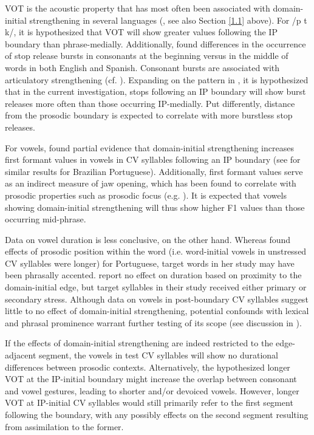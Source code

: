 \documentclass[output=paper]{langscibook}
\begin{document}
VOT is the acoustic property that has most often been associated with domain-initial strengthening in several languages (\citealt{c16}, see also Section \ref{1.1} above). For /p t k/, it is hypothesized that VOT will show greater values following the IP boundary than phrase-medially. Additionally, \citet{l01} found differences in the occurrence of stop release bursts in consonants at the beginning versus in the middle of words in both English and Spanish. Consonant bursts are associated with articulatory strengthening (cf. \citealt{sk89, te11}). Expanding on the pattern in \citet{l01}, it is hypothesized that in the current investigation, stops following an IP boundary will show burst releases more often than those occurring IP-medially. Put differently, distance from the prosodic boundary is expected to correlate with more burstless stop releases.

For vowels, \citet{ck09} found partial evidence that domain-initial strengthening increases first formant values in vowels in CV syllables following an IP boundary (see \citealt{o19} for similar results for Brazilian Portuguese). Additionally, first formant values serve as an indirect measure of jaw opening, which has been found to correlate with prosodic properties such as prosodic focus (e.g. \citealt{e98}). It is expected that vowels showing domain-initial strengthening will thus show higher F1 values than those occurring mid-phrase. 

Data on vowel duration is less conclusive, on the other hand. Whereas \citet{o19} found effects of prosodic position within the word (i.e. word-initial vowels in unstressed CV syllables were longer) for Portuguese, target words in her study may have been phrasally accented. \citet{ck09} report no effect on duration based on proximity to the domain-initial edge, but target syllables in their study received either primary or secondary stress. Although data on vowels in post-boundary CV syllables suggest little to no effect of domain-initial strengthening, potential confounds with lexical and phrasal prominence warrant further testing of its scope (see discussion in \citealt{c16}).

If the effects of domain-initial strengthening are indeed restricted to the edge-adjacent segment, the vowels in test CV syllables will show no durational differences between prosodic contexts. Alternatively, the hypothesized longer VOT at the IP-initial boundary might increase the overlap between consonant and vowel gestures, leading to shorter and/or devoiced vowels. However, longer VOT at IP-initial CV syllables would still primarily refer to the first segment following the boundary, with any possibly effects on the second segment resulting from assimilation to the former.
\end{document}
